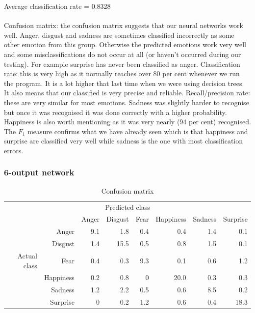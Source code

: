 \documentclass[12pt]{article}
\begin{document}
Average classification rate = 0.8328 \\ \\
Confusion matrix: the confusion matrix suggests that our neural networks work well. Anger, disgust and sadness are sometimes classified incorrectly as some other emotion from this group. Otherwise the predicted emotions work very well and some misclassifications do not occur at all (or haven't occurred during our testing). For example surprise has never been classified as anger. Classification rate: this is very high as it normally reaches over 80 per cent whenever we run the program. It is a lot higher that last time when we were using decision trees. It also means that our classified is very precise and reliable. Recall/precision rate: these are very similar for most emotions. Sadness was slightly harder to recognise but once it was recognised it was done correctly with a higher probability. Happiness is also worth mentioning as it was very nearly (94 per cent) recognised. The $F_1$ measure confirms what we have already seen which is that happiness and surprise are classified very well while sadness is the one with most classification errors.


\subsubsection*{6-output network}

\begin{table}
\centering
\begin{tabular}{r r | r r r r r r}
\multicolumn{8}{c}{Predicted class} \\
&  & Anger & Disgust & Fear & Happiness & Sadness & Surprise \\
\hline
 & Anger            & 9.1 & 1.8  & 0.4 & 0.4  & 1.4 & 0.1  \\
 & Disgust          & 1.4 & 15.5 & 0.5 & 0.8  & 1.5 & 0.1  \\
Actual class & Fear & 0.4 & 0.3  & 9.3 & 0.1  & 0.6 & 1.2  \\
 & Happiness        & 0.2 & 0.8  & 0   & 20.0 & 0.3 & 0.3  \\
 & Sadness          & 1.2 & 2.2  & 0.5 & 0.6  & 8.5 & 0.2  \\
 & Surprise         & 0   & 0.2  & 1.2 & 0.6  & 0.4 & 18.3 \\
\end{tabular}
\caption{Confusion matrix}
\end{table}
\end{document}
